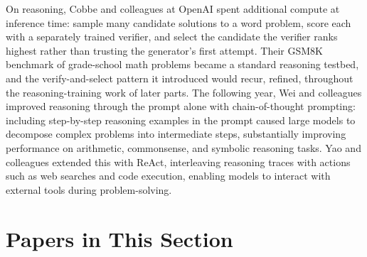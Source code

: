 On reasoning, Cobbe and colleagues at OpenAI spent additional compute at inference time: sample many candidate solutions to a word problem, score each with a separately trained verifier, and select the candidate the verifier ranks highest rather than trusting the generator's first attempt. Their GSM8K benchmark of grade-school math problems became a standard reasoning testbed, and the verify-and-select pattern it introduced would recur, refined, throughout the reasoning-training work of later parts. The following year, Wei and colleagues improved reasoning through the prompt alone with chain-of-thought prompting: including step-by-step reasoning examples in the prompt caused large models to decompose complex problems into intermediate steps, substantially improving performance on arithmetic, commonsense, and symbolic reasoning tasks. Yao and colleagues extended this with ReAct, interleaving reasoning traces with actions such as web searches and code execution, enabling models to interact with external tools during problem-solving.

\section*{Papers in This Section}

